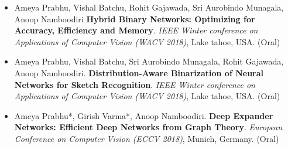 \begin{itemize}
\item Ameya Prabhu, Vishal Batchu, Rohit Gajawada, Sri Aurobindo Munagala, Anoop Namboodiri \textbf{Hybrid Binary Networks: Optimizing for Accuracy, Efficiency and Memory}. \emph{IEEE Winter  conference on Applications of Computer Vision (WACV 2018)}, Lake tahoe, USA. (Oral)
\item Ameya Prabhu, Vishal Batchu, Sri Aurobindo Munagala, Rohit Gajawada, Anoop Namboodiri. \textbf{Distribution-Aware Binarization of Neural Networks for Sketch Recognition}. \emph{IEEE Winter  conference on Applications of Computer Vision (WACV 2018)}, Lake tahoe, USA. (Oral)
\item Ameya Prabhu*, Girish Varma*, Anoop Namboodiri. \textbf{Deep Expander Networks: Efficient Deep Networks from Graph Theory}. \emph{European Conference on Computer Vision (ECCV 2018)}, Munich, Germany. (Oral)
\end{itemize}